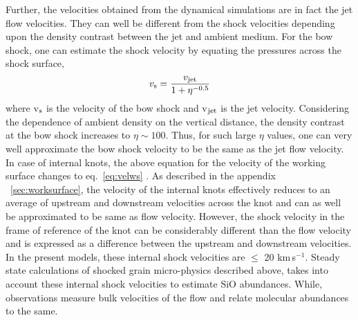 \documentclass[useAMS,usenatbib]{mn2e}
\begin{document}
Further, the velocities obtained from the dynamical simulations are in fact the
jet flow velocities. They can well be different from the shock
velocities depending upon the density contrast between the jet and
ambient medium. For the bow shock, one can estimate the shock velocity 
by equating the pressures across the shock surface, \citep[e.g.,][]{Masson:1992p14101}
\begin{equation}
\label{eq:shockjetvel}
v_{\rm s} = \frac{v_{\rm jet}}{1 + \eta^{-0.5}}
\end{equation}
where v$_{\rm s}$ is the velocity of the bow shock 
and v$_{\rm jet}$ is the jet velocity. 
Considering the dependence of ambient density on the vertical distance, 
the density contrast at the bow shock increases to $\eta \sim 100$. 
Thus, for such large $\eta$ values, one can very well 
approximate the bow shock velocity to be the same as the jet flow velocity.  
In case of internal knots, the above equation for the velocity of the working surface
changes to eq.~\ref{eq:velws} \citep{Raga:1992p16392}. 
As described in the appendix ~\ref{sec:worksurface}, the velocity of the internal 
knots effectively reduces to an average of upstream and downstream 
velocities across the knot and can as well be approximated 
to be same as flow velocity. However, the shock velocity 
in the frame of reference of the knot can be considerably different than the flow velocity 
and is expressed as a difference between the upstream and downstream velocities.  
In the present models, these internal shock velocities are $\leq$ 20 km\,s$^{-1}$. 
Steady state calculations of shocked grain 
micro-physics described above, takes into account 
these internal shock velocities to estimate 
SiO abundances. While, observations measure bulk velocities of the 
flow and relate molecular abundances to the same. 
%
\end{document}
